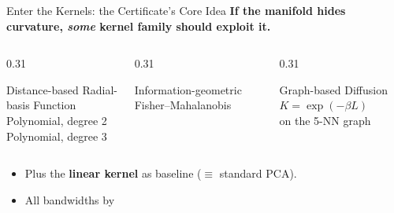 \documentclass[10pt,aspectratio=169]{beamer}
\begin{document}
\begin{frame}{Enter the Kernels: the Certificate's Core Idea}
  \textbf{If the manifold hides curvature, \emph{some} kernel family should
  exploit it.} 
  \vspace{0.35cm}
  \begin{columns}[T]
    \begin{column}{0.31\textwidth}
      \begin{exampleblock}{Distance-based}
        \small Radial-basis Function\\[2pt]
        Polynomial, degree 2\\[2pt]
        Polynomial, degree 3
      \end{exampleblock}
    \end{column}
    \begin{column}{0.31\textwidth}
      \begin{exampleblock}{Information-geometric}
        \small Fisher--Mahalanobis
      \end{exampleblock}
    \end{column}
    \begin{column}{0.31\textwidth}
      \begin{exampleblock}{Graph-based}
        \small Diffusion $K=\exp(-\beta L)$\\
        on the 5-NN graph\\[2pt]
      \end{exampleblock}
    \end{column}
  \end{columns}
  \vspace{0.25cm}
  \begin{itemize}
    \item Plus the \textbf{linear kernel} as baseline ($\equiv$ standard PCA).
    \item All bandwidths by 
  \end{itemize}
\end{frame}
\end{document}
